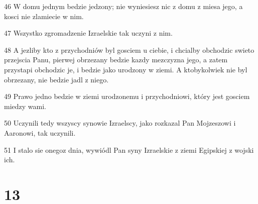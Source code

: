 \par 46 W domu jednym bedzie jedzony; nie wyniesiesz nic z domu z miesa jego, a kosci nie zlamiecie w nim.
\par 47 Wszystko zgromadzenie Izraelskie tak uczyni z nim.
\par 48 A jezliby kto z przychodniów byl gosciem u ciebie, i chcialby obchodzic swieto przejscia Panu, pierwej obrzezany bedzie kazdy mezczyzna jego, a zatem przystapi obchodzic je, i bedzie jako urodzony w ziemi. A ktobykolwiek nie byl obrzezany, nie bedzie jadl z niego.
\par 49 Prawo jedno bedzie w ziemi urodzonemu i przychodniowi, który jest gosciem miedzy wami.
\par 50 Uczynili tedy wszyscy synowie Izraelscy, jako rozkazal Pan Mojzeszowi i Aaronowi, tak uczynili.
\par 51 I stalo sie onegoz dnia, wywiódl Pan syny Izraelskie z ziemi Egipskiej z wojski ich.

\chapter{13}

